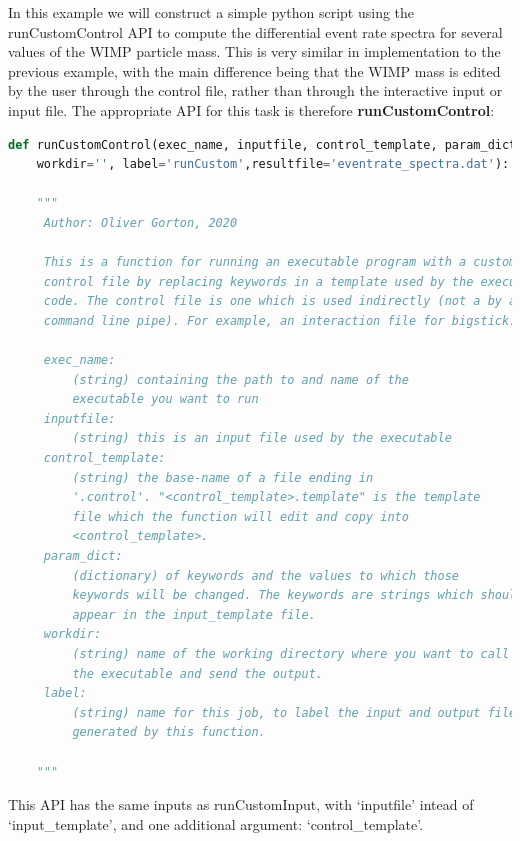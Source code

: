 \documentclass[12pt]{article}
\begin{document}
In this example we will construct a simple python script using the 
runCustomControl API to compute the differential event rate spectra for several
values of the WIMP particle mass. This is very similar in implementation to the
previous example, with the main difference being that the WIMP mass is edited by
the user through the control file, rather than through the interactive input or
input file. The appropriate API for this task is therefore \textbf{
runCustomControl}:
\begin{lstlisting}[language=python]
def runCustomControl(exec_name, inputfile, control_template, param_dict,
    workdir='', label='runCustom',resultfile='eventrate_spectra.dat'):

    """
     Author: Oliver Gorton, 2020

     This is a function for running an executable program with a custom
     control file by replacing keywords in a template used by the executed
     code. The control file is one which is used indirectly (not a by a 
     command line pipe). For example, an interaction file for bigstick.

     exec_name: 
         (string) containing the path to and name of the
         executable you want to run
     inputfile: 
         (string) this is an input file used by the executable
     control_template: 
         (string) the base-name of a file ending in 
         '.control'. "<control_template>.template" is the template 
         file which the function will edit and copy into 
         <control_template>.
     param_dict: 
         (dictionary) of keywords and the values to which those 
         keywords will be changed. The keywords are strings which should 
         appear in the input_template file. 
     workdir: 
         (string) name of the working directory where you want to call
         the executable and send the output.
     label: 
         (string) name for this job, to label the input and output files 
         generated by this function.

    """
\end{lstlisting}
This API has the same inputs as runCustomInput, with `inputfile' intead of
`input\_template', and one additional argument: `control\_template'.
\end{document}
